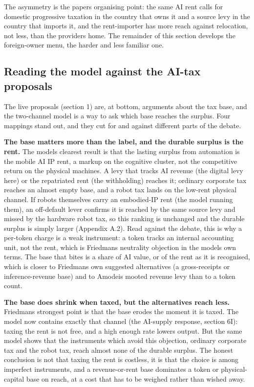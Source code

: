 \documentclass[11pt]{article}
\begin{document}
The asymmetry is the paper\textquotesingle s organising point: the same
AI rent calls for domestic progressive taxation in the country that owns
it and a source levy in the country that imports it, and the
rent-importer has more reach against relocation, not less, than the
provider\textquotesingle s home. The remainder of this section develops
the foreign-owner menu, the harder and less familiar one.

\hypertarget{reading-the-model-against-the-ai-tax-proposals}{%
\subsection{Reading the model against the AI-tax
proposals}\label{reading-the-model-against-the-ai-tax-proposals}}

The live proposals (section 1) are, at bottom, arguments about the tax
base, and the two-channel model is a way to ask which base reaches the
surplus. Four mappings stand out, and they cut for and against different
parts of the debate.

\textbf{The base matters more than the label, and the durable surplus is
the rent.} The model\textquotesingle s clearest result is that the
lasting surplus from automation is the mobile AI IP rent, a markup on
the cognitive cluster, not the competitive return on the physical
machines. A levy that tracks AI revenue (the digital levy here) or the
repatriated rent (the withholding) reaches it; ordinary corporate tax
reaches an almost empty base, and a robot tax lands on the low-rent
physical channel. If robots themselves carry an embodied-IP rent (the
model running them), an off-default lever confirms it is reached by the
same source levy and missed by the hardware robot tax, so this ranking
is unchanged and the durable surplus is simply larger (Appendix A.2).
Read against the debate, this is why a per-token charge is a weak
instrument: a token tracks an internal accounting unit, not the rent,
which is Friedman\textquotesingle s neutrality objection in the
model\textquotesingle s own terms. The base that bites is a share of AI
value, or of the rent as it is recognised, which is closer to
Friedman\textquotesingle s own suggested alternatives (a gross-receipts
or inference-revenue base) and to Amodei\textquotesingle s mooted
revenue levy than to a token count.

\textbf{The base does shrink when taxed, but the alternatives reach
less.} Friedman\textquotesingle s strongest point is that the base
erodes the moment it is taxed. The model now contains exactly that
channel (the AI-supply response, section 6I): taxing the rent is not
free, and a high enough rate lowers output. But the same model shows
that the instruments which avoid this objection, ordinary corporate tax
and the robot tax, reach almost none of the durable surplus. The honest
conclusion is not that taxing the rent is costless, it is that the
choice is among imperfect instruments, and a revenue-or-rent base
dominates a token or physical-capital base on reach, at a cost that has
to be weighed rather than wished away.
\end{document}
